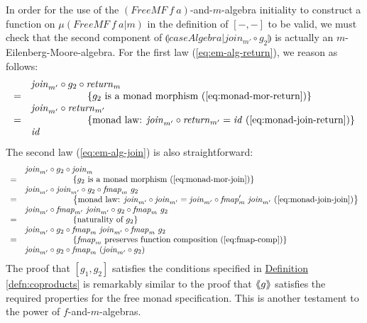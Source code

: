\documentclass{jfp1}
\newcommand{\eFold}[2]{\llparenthesis #1|#2 \rrparenthesis}
\newcommand{\fmext}[1]{\langle\kern-0.25em\langle #1 \rangle\kern-0.25em\rangle}
\newcommand{\eqAnnotation}[1]{\hspace{2cm}\left\{\textrm{#1}\right\}}
\newcommand{\defref}[1]{\hyperref[#1]{Definition \ref*{#1}}}
\begin{document}
In order for the use of the $(\mathit{FreeMF}~f~a)$-and-$m$-algebra
initiality to construct a function on $\mu(\mathit{FreeMF}~f~a|m)$ in
the definition of $[-,-]$ to be valid, we must check that the second
component of $\eFold{\mathit{caseAlgebra}}{\mathit{join_{m'}} \circ
  g_2}$ is actually an $m$-Eilenberg-Moore-algebra. For the first law
(\autoref{eq:em-alg-return}), we reason as follows:
\begin{displaymath}
  \begin{array}{cl}
    & \mathit{join}_{m'} \circ g_2 \circ \mathit{return}_m \\
    =&\eqAnnotation{$g_2$ is a monad morphism (\autoref{eq:monad-mor-return})} \\
    & \mathit{join}_{m'} \circ \mathit{return}_{m'} \\
    =&\eqAnnotation{monad law: $\mathit{join}_{m'} \circ \mathit{return}_{m'} = \mathit{id}$ (\autoref{eq:monad-join-return})} \\
    & \mathit{id}
  \end{array}
\end{displaymath}
The second law (\autoref{eq:em-alg-join}) is also straightforward:
\begin{displaymath}
  \begin{array}{cl}
    & \mathit{join}_{m'} \circ g_2 \circ \mathit{join}_m \\
    =&\eqAnnotation{$g_2$ is a monad morphism (\autoref{eq:monad-mor-join})} \\
    & \mathit{join}_{m'} \circ \mathit{join}_{m'} \circ g_2 \circ \mathit{fmap}_m~g_2 \\
    =&\eqAnnotation{monad law: $\mathit{join}_{m'} \circ \mathit{join}_{m'} = \mathit{join}_{m'} \circ \mathit{fmap}_m'~\mathit{join}_{m'}$ (\autoref{eq:monad-join-join})} \\
    & \mathit{join}_{m'} \circ \mathit{fmap}_{m'}~\mathit{join}_{m'} \circ g_2 \circ \mathit{fmap}_m~g_2 \\
    =&\eqAnnotation{naturality of $g_2$} \\
    & \mathit{join}_{m'} \circ g_2 \circ \mathit{fmap}_{m}~\mathit{join}_{m'} \circ \mathit{fmap}_m~g_2 \\
    =&\eqAnnotation{$\mathit{fmap}_m$ preserves function composition (\autoref{eq:fmap-comp})} \\
    & \mathit{join}_{m'} \circ g_2 \circ \mathit{fmap}_{m}~(\mathit{join}_{m'} \circ g_2)
  \end{array}
\end{displaymath}
The proof that $[g_1,g_2]$ satisfies the conditions specified in
\defref{defn:coproducts} is remarkably similar to the proof that
$\fmext{g}$ satisfies the required properties for the free monad
specification. This is another testament to the power of
$f$-and-$m$-algebras.



\end{document}
